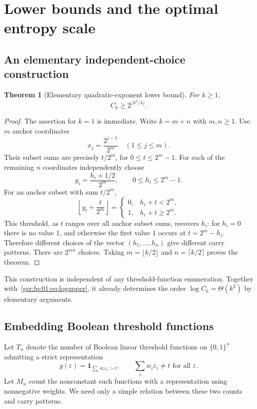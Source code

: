 \documentclass[11pt,letterpaper]{article}
\numberwithin{equation}{section}
\newtheorem{theorem}{Theorem}[section]
\theoremstyle{definition}
\theoremstyle{remark}
\newcommand{\one}{\mathbf 1}
\newcommand{\1}{\mathbf 1}
\newcommand{\floor}[1]{\left\lfloor#1\right\rfloor}
\newcommand{\srctag}[1]{\texorpdfstring{\enspace\textup{[#1]}}{ [#1]}}
\newcommand{\srcnote}[2]{\par\noindent{\small\textit{Source #1, delivered #2.}}\par}
\begin{document}
\section[{Lower bounds and the optimal entropy scale\srctag{01}}]{Lower bounds and the optimal entropy scale}\label{gsr:fp:01:sec:d10}\label{gsr:fp:01:sec:threshold}
\srcnote{01}{Section 10}

\subsection{An elementary independent-choice construction}

\begin{theorem}[Elementary quadratic-exponent lower bound]\label{gsr:fp:01:thm:carrylower}
For $k\ge1$,
\begin{equation}\label{gsr:fp:01:eq:carrylower}
 C_k\ge2^{\lfloor k^2/4\rfloor}.
\end{equation}
\end{theorem}
\begin{proof}
The assertion for $k=1$ is immediate. Write $k=m+n$ with $m,n\ge1$.
Use $m$ anchor coordinates
\[
 x_j=\frac{2^{j-1}}{2^m}\quad(1\le j\le m).
\]
Their subset sums are precisely $t/2^m$, for $0\le t\le2^m-1$.
For each of the remaining $n$ coordinates independently choose
\[
 y_i=\frac{h_i+1/2}{2^m},\qquad 0\le h_i\le2^m-1.
\]
For an anchor subset with sum $t/2^m$,
\[
 \floor{y_i+\frac{t}{2^m}}=
 \begin{cases}
 0,&h_i+t<2^m,\\
 1,&h_i+t\ge2^m.
 \end{cases}
\]
This threshold, as $t$ ranges over all anchor subset sums, recovers $h_i$:
for $h_i=0$ there is no value $1$, and otherwise the first value $1$
occurs at $t=2^m-h_i$. Therefore different choices of the vector
$(h_1,\ldots,h_n)$ give different carry patterns. There are $2^{mn}$
choices. Taking $m=\lfloor k/2\rfloor$ and $n=\lceil k/2\rceil$ proves
the theorem.
\end{proof}

This construction is independent of any threshold-function enumeration.
Together with~\eqref{gsr:fp:01:eq:logupper}, it already determines the order
$\log C_k=\Theta(k^2)$ by elementary arguments.

\subsection{Embedding Boolean threshold functions}
Let $T_n$ denote the number of Boolean linear threshold functions on
$\{0,1\}^n$ admitting a strict representation
\[
 g(\varepsilon)=\one_{\sum_iw_i\varepsilon_i>t},
 \qquad \sum_iw_i\varepsilon_i\ne t\text{ for all }\varepsilon.
\]
Let $M_n$ count the nonconstant such functions with a representation
using nonnegative weights. We need only a simple relation between these
two counts and carry patterns.
\end{document}
